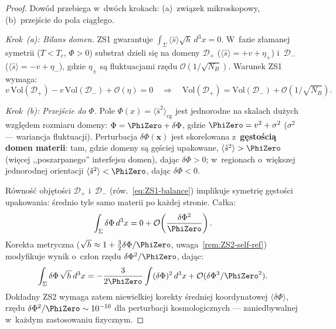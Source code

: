 \begin{proof}
Dow\'od przebiega w~dw\'och krokach: (a)~zwi\k{a}zek mikroskopowy,
(b)~przej\'scie do pola ci\k{a}g\l{}ego.

\emph{Krok~(a): Bilans domen.}
ZS1 gwarantuje $\int_\Sigma\langle\hat{s}\rangle\sqrt{h}\,d^3x = 0$.
W~fazie z\l{}amanej symetrii ($T < T_c$, $\Phi > 0$)
substrat dzieli si\k{e} na domeny $\mathcal{D}_+$
($\langle\hat{s}\rangle = +v + \eta_+$) i~$\mathcal{D}_-$
($\langle\hat{s}\rangle = -v + \eta_-$), gdzie $\eta_\pm$ s\k{a}
fluktuacjami rz\k{e}du $\mathcal{O}(1/\sqrt{N_B})$.
Warunek ZS1 wymaga:
\begin{equation}\label{eq:ZS1-balance}
  v\,\mathrm{Vol}(\mathcal{D}_+) - v\,\mathrm{Vol}(\mathcal{D}_-)
  + \mathcal{O}(\eta) = 0
  \quad\Rightarrow\quad
  \mathrm{Vol}(\mathcal{D}_+) = \mathrm{Vol}(\mathcal{D}_-)
  + \mathcal{O}(1/\sqrt{N_B}).
\end{equation}

\emph{Krok~(b): Przej\'scie do $\Phi$.}
Pole $\Phi(x) = \langle\hat{s}^2\rangle_{\mathrm{cg}}$ jest
jednorodne na skalach du\.zych wzgl\k{e}dem rozmiaru domeny:
$\Phi = \PhiZero + \delta\Phi$, gdzie $\PhiZero = v^2 + \sigma^2$
($\sigma^2$ --- wariancja fluktuacji). Perturbacja
$\delta\Phi(\mathbf{x})$ jest skorelowana z~\textbf{g\k{e}sto\'sci\k{a}
domen materii}: tam, gdzie domeny s\k{a} g\k{e}\'sciej upakowane,
$\langle\hat{s}^2\rangle > \PhiZero$ (wi\k{e}cej ,,poszarpanego''
interfejsu domen), daj\k{a}c $\delta\Phi > 0$; w~regionach
o~wi\k{e}kszej jednorodnej orientacji $\langle\hat{s}^2\rangle
< \PhiZero$, daj\k{a}c $\delta\Phi < 0$.

R\'owno\'s\'c obj\k{e}to\'sci $\mathcal{D}_+$ i~$\mathcal{D}_-$
(r\'ow.~\ref{eq:ZS1-balance}) implikuje symetri\k{e}
g\k{e}sto\'sci upakowania: \'srednio tyle samo materii
po ka\.zdej stronie. Ca\l{}ka:
\begin{equation}
  \int_\Sigma \delta\Phi\,d^3x = 0
  + \mathcal{O}\!\left(\frac{\delta\Phi^2}{\PhiZero}\right).
\end{equation}
Korekta metryczna ($\sqrt{h} \approx 1 + \frac{3}{2}\delta\Phi/\PhiZero$,
uwaga~\ref{rem:ZS2-self-ref}) modyfikuje wynik o~cz\l{}on rz\k{e}du
$\delta\Phi^2/\PhiZero$, daj\k{a}c:
\begin{equation}
  \int_\Sigma \delta\Phi\,\sqrt{h}\,d^3x
  = -\frac{3}{2\PhiZero}\int(\delta\Phi)^2\,d^3x
  + \mathcal{O}(\delta\Phi^3/\PhiZero^2).
\end{equation}
Dok\l{}adny ZS2 wymaga zatem niewielkiej korekty \'sredniej
koordynatowej $\langle\delta\Phi\rangle$, rz\k{e}du
$\delta\Phi^2/\PhiZero \sim 10^{-10}$ dla perturbacji
kosmologicznych --- zaniedbywalnej w~ka\.zdym zastosowaniu
fizycznym.
\end{proof}

